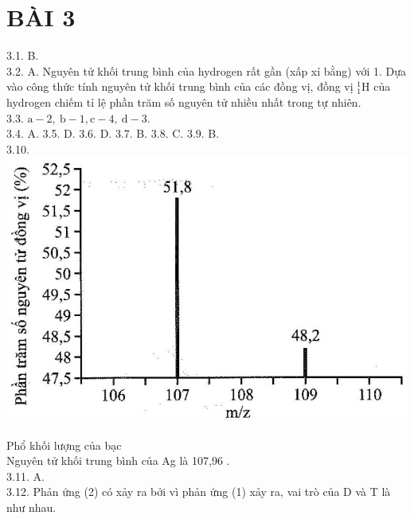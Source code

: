 \documentclass[10pt]{article}
\begin{document}
\section*{BÀI 3}
3.1. B.\\
3.2. A. Nguyên tử khối trung bình của hydrogen rất gần (xấp xỉ bằng) với 1. Dựa vào công thức tính nguyên tử khối trung bình của các đồng vị, đồng vị ${ }_{1}^{1} \mathrm{H}$ của hydrogen chiếm tỉ lệ phần trăm số nguyên tử nhiều nhất trong tự nhiên.\\
3.3. $\mathrm{a}-2, \mathrm{~b}-1, \mathrm{c}-4, \mathrm{~d}-3$.\\
3.4. A. 3.5. D. 3.6. D. 3.7. B. 3.8. C. 3.9. B.\\
3.10.\\
\includegraphics[max width=\textwidth, center]{2025_10_23_baf6b6057fd5ebd09626g-03}

Phổ khối lượng của bạc\\
Nguyên tử khối trung bình của Ag là 107,96 .\\
3.11. A.\\
3.12. Phản ứng (2) có xảy ra bởi vì phản ứng (1) xảy ra, vai trò của D và T là như nhau.
\end{document}
